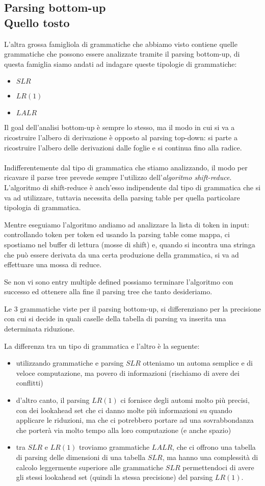 \documentclass[class=book, crop=false, oneside, 12pt]{standalone}
\begin{document}
\subsection{Parsing bottom-up\\ \small{Quello tosto}}
L'altra grossa famigliola di grammatiche che abbiamo visto contiene quelle grammatiche che possono essere analizzate tramite il parsing bottom-up, di questa famiglia siamo andati ad indagare queste tipologie di grammatiche:
\begin{itemize}
    \item \(SLR\)
    \item \(LR(1)\)
    \item \(LALR\)
\end{itemize}
Il goal dell'analisi bottom-up è sempre lo stesso, ma il modo in cui si va a ricostruire l'albero di derivazione è opposto al parsing top-down: si parte a ricostruire l'albero delle derivazioni dalle foglie e si continua fino alla radice.
\\\\
Indifferentemente dal tipo di grammatica che stiamo analizzando, il modo per ricavare il parse tree prevede sempre l'utilizzo dell'\emph{algoritmo shift-reduce}.
L'algoritmo di shift-reduce è anch'esso indipendente dal tipo di grammatica che si va ad utilizzare, tuttavia necessita della parsing table per quella particolare tipologia di grammatica.

Mentre eseguiamo l'algoritmo andiamo ad analizzare la lista di token in input: controllando token per token ed usando la parsing table come mappa, ci spostiamo nel buffer di lettura (mosse di shift) e, quando si incontra una stringa che può essere derivata da una certa produzione della grammatica, si va ad effettuare una mossa di reduce.

Se non vi sono entry multiple defined possiamo terminare l'algoritmo con successo ed ottenere alla fine il parsing tree che tanto desideriamo.

Le 3 grammatiche viste per il parsing bottom-up, si differenziano per la precisione con cui si decide in quali caselle della tabella di parsing va inserita una determinata riduzione.

La differenza tra un tipo di grammatica e l'altro è la seguente: 
\begin{itemize}
	\item utilizzando grammatiche e parsing \(SLR\) otteniamo un automa semplice e di veloce computazione, ma povero di informazioni (rischiamo di avere dei conflitti)
	\item d'altro canto, il parsing \(LR(1)\) ci fornisce degli automi molto più precisi, con dei lookahead set che ci danno molte più informazioni su quando applicare le riduzioni, ma che ci potrebbero portare ad una sovrabbondanza che porterà via molto tempo alla loro computazione (e anche spazio)
	\item tra \(SLR\) e \(LR(1)\) troviamo grammatiche \(LALR\), che ci offrono una tabella di parsing delle dimensioni di una tabella \(SLR\), ma hanno una complessità di calcolo leggermente superiore alle grammatiche \(SLR\) permettendoci di avere gli stessi lookahead set (quindi la stessa precisione) del parsing \(LR(1)\).
\end{itemize}
\end{document}
